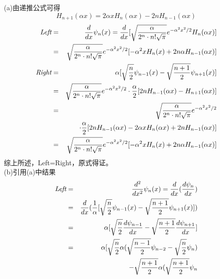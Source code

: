 \documentclass[a4paper]{article}
\begin{document}
\begin{CJK*}{UTF8}{song}
{    (a)由递推公式可得
    $$H_{n+1}(\alpha x) = 2\alpha x H_{n}(\alpha x) - 2nH_{n-1}(\alpha x)$$
    \begin{eqnarray}
        \emph{Left} & = & \frac{d}{dx}\psi_{n}(x)
                        = \frac{d}{dx}[\sqrt{\frac{\alpha}{2^{n}\cdot n!\sqrt{\pi}}}
                        e^{-\alpha^{2}x^{2}/2}H_{n}(\alpha x)]\nonumber\\
                    & = &   \sqrt{\frac{\alpha}{2^{n}\cdot n!\sqrt{\pi}}}
                        e^{-\alpha^{2}x^{2}/2}[-\alpha^{2}x H_{n}(x) + 2n\alpha H_{n-1}(\alpha x)]\nonumber\\
        \emph{Right}& = & {\alpha}[\sqrt{\frac{n}{2}}\psi_{n-1}(x)
                        - \sqrt{\frac{n + 1}{2}}\psi_{n+1}(x)]\nonumber\\
                    & = & \sqrt{\frac{\alpha}{2^{n}\cdot n!\sqrt{\pi}}}e^{-\alpha^{2}x^{2}/2}
                        \cdot \frac{\alpha}{2}[2 n H_{n-1}(\alpha x) - H_{n+1}(\alpha x)]\nonumber\\
                    & = & \sqrt{\frac{\alpha}{2^{n}\cdot n!\sqrt{\pi}}}e^{-\alpha^{2}x^{2}/2}\nonumber\\
                    &   & \cdot \frac{\alpha}{2}[2 n H_{n-1}(\alpha x)
                        - 2\alpha x H_{n}(\alpha x) + 2nH_{n-1}(\alpha x)]\nonumber\\
                    & = &   \sqrt{\frac{\alpha}{2^{n}\cdot n!\sqrt{\pi}}}
                        e^{-\alpha^{2}x^{2}/2}[-\alpha^{2}x H_{n}(x) + 2n\alpha H_{n-1}(\alpha x)]\nonumber
    \end{eqnarray}
    综上所述，Left=Right，原式得证。\\[12pt]
    (b)引用(a)中结果
    \begin{eqnarray}
        \emph{Left} & = & \frac{d^{2}}{d x^{2}}\psi_{n}(x)
                        = \frac{d}{d x}(\frac{d \psi_{n}}{d x})\nonumber\\
                    & = & \frac{d}{d x}(\frac{1}{\alpha}[\sqrt{\frac{n}{2}}\psi_{n-1}(x)
                        - \sqrt{\frac{n + 1}{2}}\psi_{n+1}(x)])\nonumber\\
                    & = & {\alpha}[\sqrt{\frac{n}{2}}\frac{d\psi_{n-1}}{d x}
                        - \sqrt{\frac{n + 1}{2}}\frac{d\psi_{n+1}}{d x}]\nonumber\\
                    & = &{\alpha}[\sqrt{\frac{n}{2}}{\alpha}(\sqrt{\frac{n-1}{2}}\psi_{n-2}
                        - \sqrt{\frac{n}{2}}\psi_{n})\nonumber\\
                    &   & - \sqrt{\frac{n + 1}{2}}{\alpha}(\sqrt{\frac{n+1}{2}}\psi_{n}

\end{eqnarray}}
\end{CJK*}
\end{document}
